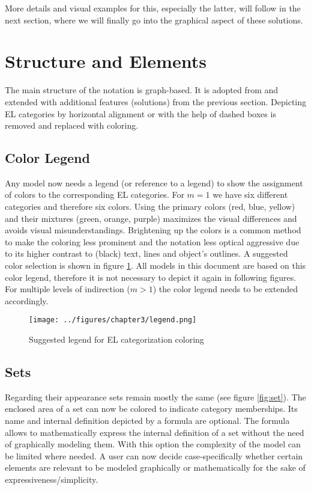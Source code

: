 \documentclass[twoside, openright, 12pt]{book}
\begin{document}
\noindent
More details and visual examples for this, especially the latter, will follow in the next section, where we will finally go into the graphical aspect of these solutions.



\section{Structure and Elements}
\label{gsl_elements}
The main structure of the notation is graph-based.
It is adopted from \cite{Amthor18} and extended with additional features (solutions) from the previous section.
Depicting EL categories by horizontal alignment or with the help of dashed boxes is removed and replaced with coloring.



\subsection{Color Legend}
Any model now needs a legend (or reference to a legend) to show the assignment of colors to the corresponding EL categories.
For $m=1$ we have six different categories and therefore six colors.
Using the primary colors (red, blue, yellow) and their mixtures (green, orange, purple) maximizes the visual differences and avoids visual misunderstandings.
Brightening up the colors is a common method to make the coloring less prominent and the notation less optical aggressive due to its higher contrast to (black) text, lines and object's outlines.
A suggested color selection is shown in figure \ref{fig:legend}.
All models in this document are based on this color legend, therefore it is not necessary to depict it again in following figures.
For multiple levels of indirection ($m>1$) the color legend needs to be extended accordingly.

\begin{figure}[htb]
	\centering
	\texttt{[image: ../figures/chapter3/legend.png]}
	\caption{Suggested legend for EL categorization coloring}
	\label{fig:legend}
\end{figure}



\subsection{Sets}
Regarding their appearance sets remain mostly the same (see figure \ref{fig:set}).
The enclosed area of a set can now be colored to indicate category memberships.
Its name and internal definition depicted by a formula are optional.
The formula allows to mathematically express the internal definition of a set without the need of graphically modeling them.
With this option the complexity of the model can be limited where needed.
A user can now decide case-specifically whether certain elements are relevant to be modeled graphically or mathematically for the sake of expressiveness/simplicity.
\end{document}
